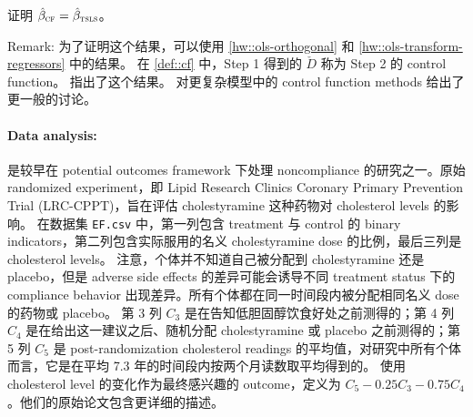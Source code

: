  证明 $\hat{\beta}_\textsc{cf} = \hat{\beta}_\textsc{tsls}$。
 
 
 Remark:
为了证明这个结果，可以使用 \cref{hw::ols-orthogonal} 和 \cref{hw::ols-transform-regressors} 中的结果。
  在 \cref{def::cf} 中，Step 1 得到的 $\check{D}$ 称为 Step 2 的 control function。
 \citet{hausman1978specification} 指出了这个结果。\citet{wooldridge2015control} 对更复杂模型中的 control function methods 给出了更一般的讨论。 
 
  


 

%
%
%
%
%


\paragraph{Data analysis: \citet{efron1991compliance}}

\citet{efron1991compliance} 是较早在 potential outcomes framework 下处理 noncompliance 的研究之一。原始 randomized experiment，即 Lipid Research Clinics Coronary Primary Prevention Trial (LRC-CPPT)，旨在评估 cholestyramine 这种药物对 cholesterol levels 的影响。
在数据集 \texttt{EF.csv} 中，第一列包含 treatment 与 control 的 binary indicators，第二列包含实际服用的名义 cholestyramine dose 的比例，最后三列是 cholesterol levels。
注意，个体并不知道自己被分配到 cholestyramine 还是 placebo，但是 adverse side effects 的差异可能会诱导不同 treatment status 下的 compliance behavior 出现差异。所有个体都在同一时间段内被分配相同名义 dose 的药物或 placebo。
第 3 列 $C_3$ 是在告知低胆固醇饮食好处之前测得的；第 4 列 $C_4$ 是在给出这一建议之后、随机分配 cholestyramine 或 placebo 之前测得的；第 5 列 $C_5$ 是 post-randomization cholesterol readings 的平均值，对研究中所有个体而言，它是在平均 7.3 年的时间段内按两个月读数取平均得到的。\citet{efron1991compliance} 使用 cholesterol level 的变化作为最终感兴趣的 outcome，定义为 $C_5 - 0.25C_3 - 0.75C_4$。他们的原始论文包含更详细的描述。 
 

